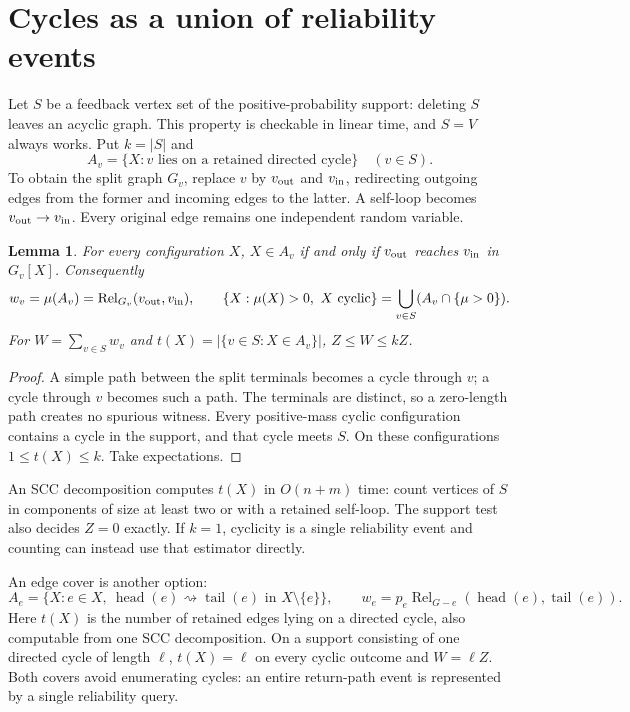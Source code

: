 \documentclass[11pt]{article}
\newtheorem{lemma}[theorem]{Lemma}
\newcommand{\Rel}{\operatorname{Rel}}
\begin{document}
\section{Cycles as a union of reliability events}\label{sec:witness}
Let $S$ be a feedback vertex set of the positive-probability support:
deleting $S$ leaves an acyclic graph. This property is checkable in linear
time, and $S=V$ always works. Put $k=|S|$ and
\[
 A_v=\{X:v\text{ lies on a retained directed cycle}\}\quad(v\in S).
\]
To obtain the split graph $G_v$, replace $v$ by $v_{\rm out}$ and
$v_{\rm in}$, redirecting outgoing edges from the former and incoming edges
to the latter. A self-loop becomes $v_{\rm out}\to v_{\rm in}$.
Every original edge remains one independent random variable.

\begin{lemma}\label{lem:vertex}
For every configuration $X$, $X\in A_v$ if and only if $v_{\rm out}$ reaches
$v_{\rm in}$ in $G_v[X]$. Consequently
\[
 w_v=\mu(A_v)=\Rel_{G_v}(v_{\rm out},v_{\rm in}),\qquad
 \{X:\mu(X)>0,\ X\text{ cyclic}\}=\bigcup_{v\in S}(A_v\cap\{\mu>0\}).
\]
For $W=\sum_{v\in S}w_v$ and $t(X)=|\{v\in S:X\in A_v\}|$,
$Z\leq W\leq kZ$.
\end{lemma}
\begin{proof}
A simple path between the split terminals becomes a cycle through $v$;
a cycle through $v$ becomes such a path. The terminals are distinct, so a
zero-length path creates no spurious witness. Every positive-mass cyclic
configuration contains a cycle in the support, and that cycle meets $S$.
On these configurations $1\leq t(X)\leq k$. Take expectations.
\end{proof}

An SCC decomposition computes $t(X)$ in $O(n+m)$ time: count vertices of
$S$ in components of size at least two or with a retained self-loop.
The support test also decides $Z=0$ exactly. If $k=1$, cyclicity is a
single reliability event and counting can instead use that estimator directly.

An edge cover is another option:
\[
 A_e=\{X:e\in X,\ \operatorname{head}(e)\rightsquigarrow
       \operatorname{tail}(e)\text{ in }X\setminus\{e\}\},\qquad
 w_e=p_e\Rel_{G-e}(\operatorname{head}(e),\operatorname{tail}(e)).
\]
Here $t(X)$ is the number of retained edges lying on a directed cycle,
also computable from one SCC decomposition. On a support consisting of
one directed cycle of length $\ell$, $t(X)=\ell$ on every cyclic outcome
and $W=\ell Z$. Both covers avoid enumerating cycles: an entire return-path
event is represented by a single reliability query.
\end{document}
